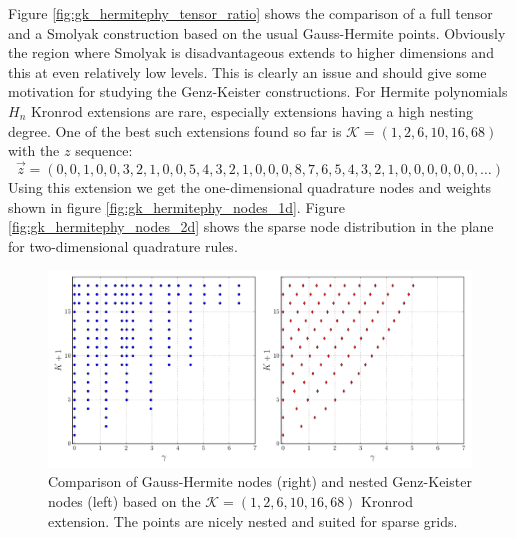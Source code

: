 \documentclass[a4paper,10pt]{article}
\begin{document}
Figure \ref{fig:gk_hermitephy_tensor_ratio} shows the comparison of a full tensor
and a Smolyak construction based on the usual Gauss-Hermite points. Obviously the region
where Smolyak is disadvantageous extends to higher dimensions and this at even relatively
low levels. This is clearly an issue and should give some motivation for studying the
Genz-Keister constructions.
For Hermite polynomials $H_n$ Kronrod extensions are rare, especially extensions
having a high nesting degree. One of the best such extensions found so far is
$\mathcal{K} = (1, 2, 6, 10, 16, 68)$ with the $z$ sequence:
\begin{equation*}
  \vec{z} = (0, 0, 1, 0, 0, 3, 2, 1, 0, 0, 5, 4, 3, 2, 1, 0, 0, 0, 8, 7,
             6, 5, 4, 3, 2, 1, 0, 0, 0, 0, 0, 0, \ldots)
\end{equation*}
Using this extension we get the one-dimensional quadrature nodes and weights shown
in figure \ref{fig:gk_hermitephy_nodes_1d}.
Figure \ref{fig:gk_hermitephy_nodes_2d} shows the sparse
node distribution in the plane for two-dimensional quadrature rules.

\begin{figure}[h]
  \centering
  \includegraphics[width=\linewidth]{./img/gk_hermitephy_nodes_cmp.pdf}
  \caption{Comparison of Gauss-Hermite nodes (right) and nested Genz-Keister nodes (left)
  based on the $\mathcal{K} = (1, 2, 6, 10, 16, 68)$ Kronrod extension. The points are
  nicely nested and suited for sparse grids.}
  \label{fig:gk_hermitephy_nodes_cmp}
\end{figure}
\end{document}
